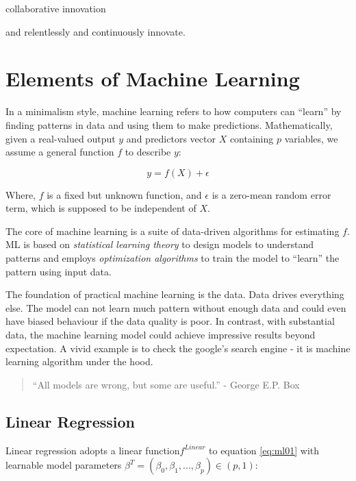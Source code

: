 \documentclass[
]{book}
\begin{document}
collaborative innovation

and relentlessly and continuously innovate.

\hypertarget{elements-of-machine-learning}{%
\chapter{Elements of Machine Learning}\label{elements-of-machine-learning}}

In a minimalism style, machine learning refers to how computers can ``learn'' by finding patterns in data and using them to make predictions. Mathematically, given a real-valued output \(y\) and predictors vector \(X\) containing \(p\) variables, we assume a general function \(f\) to describe \(y\):

\begin{equation} 
y = f(X) + \epsilon
\label{eq:ml01}
\end{equation}

Where, \(f\) is a fixed but unknown function, and \(\epsilon\) is a zero-mean random error term, which is supposed to be independent of \(X\).

The core of machine learning is a suite of data-driven algorithms for estimating \(f\). ML is based on {\emph{statistical learning theory}} to design models to understand patterns and employs {\emph{optimization algorithms}} to train the model to ``learn'' the pattern using input data.

The foundation of practical machine learning is the data. Data drives everything else. The model can not learn much pattern without enough data and could even have biased behaviour if the data quality is poor. In contrast, with substantial data, the machine learning model could achieve impressive results beyond expectation. A vivid example is to check the google's search engine - it is machine learning algorithm under the hood.

\begin{quote}
``All models are wrong, but some are useful.'' - George E.P. Box
\end{quote}

\hypertarget{linear-regression}{%
\section{Linear Regression}\label{linear-regression}}

Linear regression adopts a linear function\(f^{Linear}\) to equation \eqref{eq:ml01} with learnable model parameters \(\beta^T =(\beta_0,\beta_1,...,\beta_p) \in (p,1)\):
\end{document}
